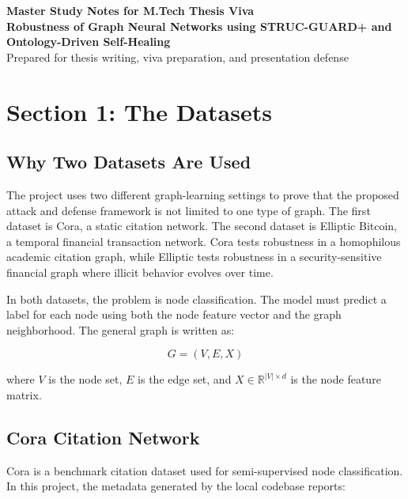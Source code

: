 \documentclass[12pt,a4paper]{article}
\begin{document}
\begin{center}
{\Large \textbf{Master Study Notes for M.Tech Thesis Viva}}\\[0.2cm]
{\large \textbf{Robustness of Graph Neural Networks using STRUC-GUARD+ and Ontology-Driven Self-Healing}}\\[0.2cm]
{\normalsize Prepared for thesis writing, viva preparation, and presentation defense}
\end{center}

\tableofcontents
\newpage

\section{Section 1: The Datasets}

\subsection{Why Two Datasets Are Used}
The project uses two different graph-learning settings to prove that the proposed attack and defense framework is not limited to one type of graph. The first dataset is Cora, a static citation network. The second dataset is Elliptic Bitcoin, a temporal financial transaction network. Cora tests robustness in a homophilous academic citation graph, while Elliptic tests robustness in a security-sensitive financial graph where illicit behavior evolves over time.

In both datasets, the problem is node classification. The model must predict a label for each node using both the node feature vector and the graph neighborhood. The general graph is written as:

$$
G=(V,E,X)
$$

where $V$ is the node set, $E$ is the edge set, and $X \in \mathbb{R}^{|V|\times d}$ is the node feature matrix.

\subsection{Cora Citation Network}
Cora is a benchmark citation dataset used for semi-supervised node classification. In this project, the metadata generated by the local codebase reports:
\end{document}
